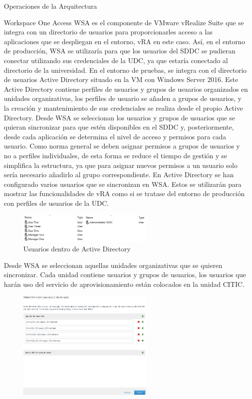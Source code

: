\begin{subsection}{Operaciones de la Arquitectura}
    \begin{subsubsection}{Workspace One Access}
        WSA es el componente de VMware vRealize Suite que se integra con un directorio de usuarios para proporcionarles acceso a las aplicaciones que se despliegan en el entorno, vRA en este caso. Así, en el entorno de producción, WSA se utilizaría para que los usuarios del SDDC se pudieran conectar utilizando sus credenciales de la UDC, ya que estaría conectado al directorio de la universidad.        
        En el entorno de pruebas, se integra con el directorio de usuarios Active Directory situado en la VM con Windows Server 2016. Este Active Directory contiene perfiles de usuarios y grupos de usuarios organizados en unidades organizativas, los perfiles de usuario se añaden a grupos de usuarios, y la creación y mantenimiento de sus credenciales se realiza desde el propio Active Directory. Desde WSA se seleccionan los usuarios y grupos de usuarios que se quieran sincronizar para que estén disponibles en el SDDC y, posteriormente, desde cada aplicación se determina el nivel de acceso y permisos para cada usuario. Como norma general se deben asignar permisos a grupos de usuarios y no a perfiles individuales, de esta forma se reduce el tiempo de gestión y se simplifica la estructura, ya que para asignar nuevos permisos a un usuario solo sería necesario añadirlo al grupo correspondiente.        
        En Active Directory se han configurado varios usuarios que se sincronizan en WSA. Estos se utilizarán para mostrar las funcionalidades de vRA como si se tratase del entorno de producción con perfiles de usuarios de la UDC.
        \begin{figure}[h]
            \centering
            \includegraphics[width=0.6\textwidth]{imaxes/pruebaconcepto/vrealize/users-AD.png}
            \caption{Usuarios dentro de Active Directory}
            \label{fig:users-defined-AD}
        \end{figure}        
        Desde WSA se seleccionan aquellas unidades organizativas que se quieren sincronizar. Cada unidad contiene usuarios y grupos de usuarios, los usuarios que harán uso del servicio de aprovisionamiento están colocados en la unidad CITIC. 
        \begin{figure}[h]
            \centering
            \includegraphics[width=0.6\textwidth]{imaxes/pruebaconcepto/vrealize/syncing-users.png}

\end{figure}
\end{subsubsection}
\end{subsection}
